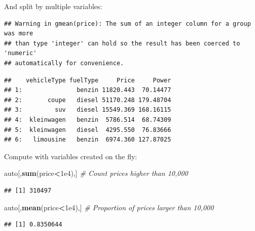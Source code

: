 \documentclass[]{book}
\newenvironment{Shaded}{\begin{snugshade}}{\end{snugshade}}
\newcommand{\KeywordTok}[1]{\textcolor[rgb]{0.13,0.29,0.53}{\textbf{#1}}}
\newcommand{\DataTypeTok}[1]{\textcolor[rgb]{0.13,0.29,0.53}{#1}}
\newcommand{\FloatTok}[1]{\textcolor[rgb]{0.00,0.00,0.81}{#1}}
\newcommand{\StringTok}[1]{\textcolor[rgb]{0.31,0.60,0.02}{#1}}
\newcommand{\CommentTok}[1]{\textcolor[rgb]{0.56,0.35,0.01}{\textit{#1}}}
\newcommand{\OperatorTok}[1]{\textcolor[rgb]{0.81,0.36,0.00}{\textbf{#1}}}
\newcommand{\NormalTok}[1]{#1}
\theoremstyle{definition}
\theoremstyle{definition}
\theoremstyle{definition}
\theoremstyle{remark}
\begin{document}
And split by multiple variables:

\begin{Shaded}
\end{Shaded}

\begin{verbatim}
## Warning in gmean(price): The sum of an integer column for a group was more
## than type 'integer' can hold so the result has been coerced to 'numeric'
## automatically for convenience.
\end{verbatim}

\begin{verbatim}
##    vehicleType fuelType     Price     Power
## 1:               benzin 11820.443  70.14477
## 2:       coupe   diesel 51170.248 179.48704
## 3:         suv   diesel 15549.369 168.16115
## 4:  kleinwagen   benzin  5786.514  68.74309
## 5:  kleinwagen   diesel  4295.550  76.83666
## 6:   limousine   benzin  6974.360 127.87025
\end{verbatim}

Compute with variables created on the fly:

\begin{Shaded}
\begin{Highlighting}[]
\NormalTok{auto[,}\KeywordTok{sum}\NormalTok{(price}\OperatorTok{<}\FloatTok{1e4}\NormalTok{),] }\CommentTok{# Count prices higher than 10,000}
\end{Highlighting}
\end{Shaded}

\begin{verbatim}
## [1] 310497
\end{verbatim}

\begin{Shaded}
\begin{Highlighting}[]
\NormalTok{auto[,}\KeywordTok{mean}\NormalTok{(price}\OperatorTok{<}\FloatTok{1e4}\NormalTok{),] }\CommentTok{# Proportion of prices larger than 10,000}
\end{Highlighting}
\end{Shaded}

\begin{verbatim}
## [1] 0.8350644
\end{verbatim}
\end{document}
